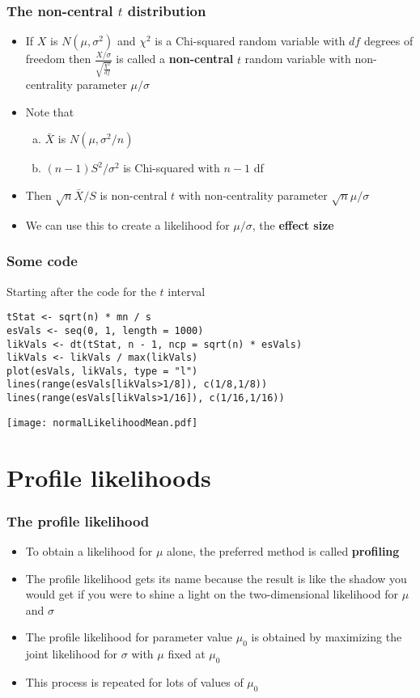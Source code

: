 \documentclass[aspectratio=169]{beamer}
\begin{document}
\begin{frame}\frametitle{The non-central $t$ distribution}
\begin{itemize}
\item If $X$ is $N(\mu,\sigma^2)$ and $\chi^2$ is a Chi-squared random
  variable with $df$ degrees of freedom then
  $\frac{X/\sigma}{\sqrt{\frac{\chi^2}{df}}}$ is called a {\bf
    non-central} $t$ random variable with non-centrality parameter
  $\mu/\sigma$
\item Note that
  \begin{enumerate}[a.]
  \item $\bar X$ is $N(\mu, \sigma^2/n)$
  \item $(n-1)S^2/\sigma^2$ is Chi-squared with $n-1$ df 
  \end{enumerate}
\item Then $\sqrt{n}\bar X / S$ is non-central $t$ with non-centrality
  parameter $\sqrt{n}\mu/\sigma$
\item We can use this to create a likelihood for $\mu/\sigma$, the {\bf effect size}
\end{itemize}
\end{frame}

\begin{frame}[fragile]\frametitle{Some code}
Starting after the code for the $t$ interval
\begin{verbatim}
tStat <- sqrt(n) * mn / s
esVals <- seq(0, 1, length = 1000)
likVals <- dt(tStat, n - 1, ncp = sqrt(n) * esVals)
likVals <- likVals / max(likVals)
plot(esVals, likVals, type = "l")
lines(range(esVals[likVals>1/8]), c(1/8,1/8))
lines(range(esVals[likVals>1/16]), c(1/16,1/16))
\end{verbatim}
\end{frame}

\begin{frame}
\texttt{[image: normalLikelihoodMean.pdf]}
\end{frame}

\section{Profile likelihoods}
\begin{frame}\frametitle{The profile likelihood}
\begin{itemize}
\item To obtain a likelihood for $\mu$ alone, the preferred method is called {\bf profiling}
\item The profile likelihood gets its name because the result is like the shadow you would
  get if you were to shine a light on the two-dimensional likelihood for $\mu$ and $\sigma$
\item The profile likelihood for parameter value $\mu_0$ is obtained by maximizing the
  joint likelihood for $\sigma$ with $\mu$ fixed at $\mu_0$
\item This process is repeated for lots of values of $\mu_0$
\end{itemize}
\end{frame}
\end{document}
